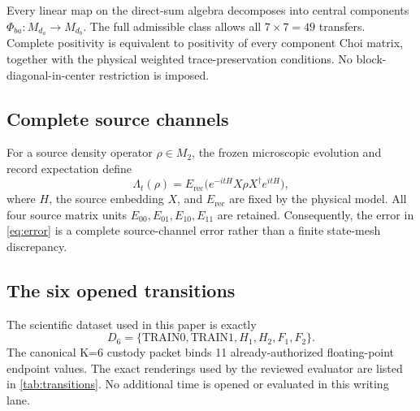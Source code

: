 Every linear map on the direct-sum algebra decomposes into central components $\Phi_{ba}:M_{d_a}\to M_{d_b}$.  The full admissible class allows all $7\times7=49$ transfers.  Complete positivity is equivalent to positivity of every component Choi matrix, together with the physical weighted trace-preservation conditions.  No block-diagonal-in-center restriction is imposed.

\subsection{Complete source channels}

For a source density operator $\rho\in M_2$, the frozen microscopic evolution and record expectation define
\begin{equation}
\Lambda_t(\rho)
=E_{\mathrm{rec}}
\bigl(e^{-itH}X\rho X^\dagger e^{itH}\bigr),
\label{eq:source-channel}
\end{equation}
where $H$, the source embedding $X$, and $E_{\mathrm{rec}}$ are fixed by the physical model.  All four source matrix units $E_{00},E_{01},E_{10},E_{11}$ are retained.  Consequently, the error in \cref{eq:error} is a complete source-channel error rather than a finite state-mesh discrepancy.

\subsection{The six opened transitions}

The scientific dataset used in this paper is exactly
\begin{equation}
D_6=\{\mathrm{TRAIN0},\mathrm{TRAIN1},H_1,H_2,F_1,F_2\}.
\end{equation}
The canonical K=6 custody packet binds 11 already-authorized floating-point endpoint values.  The exact renderings used by the reviewed evaluator are listed in \cref{tab:transitions}.  No additional time is opened or evaluated in this writing lane.

